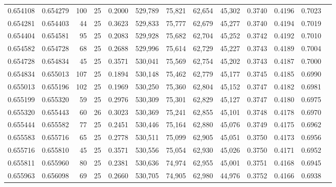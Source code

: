 \begin{tabular}{rrrrrrrrrrrrr}
0.654108 & 0.654279 &   100 &  25 &                                     0.2000 & 529,789 &  75,821 &  62,654 &  45,302 & 0.3740 & 0.4196 & 0.7023 \\
0.654281 & 0.654403 &    44 &  25 &                                     0.3623 & 529,833 &  75,777 &  62,679 &  45,277 & 0.3740 & 0.4194 & 0.7019 \\
0.654404 & 0.654581 &    95 &  25 &                                     0.2083 & 529,928 &  75,682 &  62,704 &  45,252 & 0.3742 & 0.4192 & 0.7010 \\
0.654582 & 0.654728 &    68 &  25 &                                     0.2688 & 529,996 &  75,614 &  62,729 &  45,227 & 0.3743 & 0.4189 & 0.7004 \\
0.654728 & 0.654834 &    45 &  25 &                                     0.3571 & 530,041 &  75,569 &  62,754 &  45,202 & 0.3743 & 0.4187 & 0.7000 \\
0.654834 & 0.655013 &   107 &  25 &                                     0.1894 & 530,148 &  75,462 &  62,779 &  45,177 & 0.3745 & 0.4185 & 0.6990 \\
0.655013 & 0.655196 &   102 &  25 &                                     0.1969 & 530,250 &  75,360 &  62,804 &  45,152 & 0.3747 & 0.4182 & 0.6981 \\
0.655199 & 0.655320 &    59 &  25 &                                     0.2976 & 530,309 &  75,301 &  62,829 &  45,127 & 0.3747 & 0.4180 & 0.6975 \\
0.655320 & 0.655443 &    60 &  26 &                                     0.3023 & 530,369 &  75,241 &  62,855 &  45,101 & 0.3748 & 0.4178 & 0.6970 \\
0.655444 & 0.655582 &    77 &  25 &                                     0.2451 & 530,446 &  75,164 &  62,880 &  45,076 & 0.3749 & 0.4175 & 0.6962 \\
0.655583 & 0.655716 &    65 &  25 &                                     0.2778 & 530,511 &  75,099 &  62,905 &  45,051 & 0.3750 & 0.4173 & 0.6956 \\
0.655716 & 0.655810 &    45 &  25 &                                     0.3571 & 530,556 &  75,054 &  62,930 &  45,026 & 0.3750 & 0.4171 & 0.6952 \\
0.655811 & 0.655960 &    80 &  25 &                                     0.2381 & 530,636 &  74,974 &  62,955 &  45,001 & 0.3751 & 0.4168 & 0.6945 \\
0.655963 & 0.656098 &    69 &  25 &                                     0.2660 & 530,705 &  74,905 &  62,980 &  44,976 & 0.3752 & 0.4166 & 0.6938 \\

\end{tabular}

